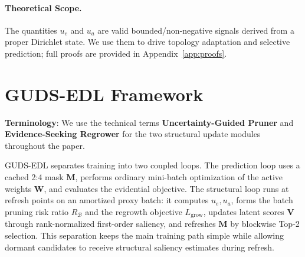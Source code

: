 \documentclass[letterpaper]{article} %
\begin{document}
\paragraph{Theoretical Scope.}
The quantities $u_e$ and $u_a$ are valid bounded/non-negative signals derived from a proper Dirichlet state. We use them to drive topology adaptation and selective prediction; full proofs are provided in Appendix~\ref{app:proofs}.


\section{GUDS-EDL Framework}\label{sec:methodology}

\textbf{Terminology}: We use the technical terms \textbf{Uncertainty-Guided Pruner} and \textbf{Evidence-Seeking Regrower} for the two structural update modules throughout the paper.

GUDS-EDL separates training into two coupled loops. The prediction loop uses a cached 2:4 mask $\bm{M}$, performs ordinary mini-batch optimization of the active weights $\bm{W}$, and evaluates the evidential objective. The structural loop runs at refresh points on an amortized proxy batch: it computes $u_e,u_a$, forms the batch pruning risk ratio $R_{\mathcal B}$ and the regrowth objective $L_{\text{grow}}$, updates latent scores $\bm{V}$ through rank-normalized first-order saliency, and refreshes $\bm{M}$ by blockwise Top-2 selection. This separation keeps the main training path simple while allowing dormant candidates to receive structural saliency estimates during refresh.
\end{document}
